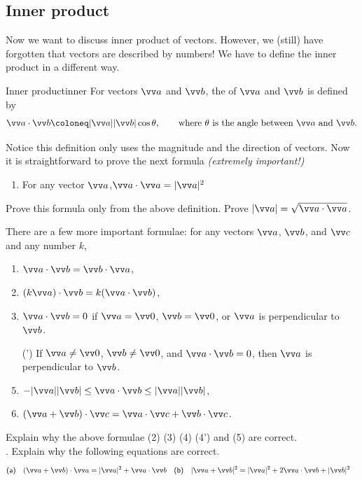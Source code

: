 \documentclass[11pt,pdfa,lastpage]{MishoNote}
\begin{document}
\subsection{Inner product}
Now we want to discuss inner product of vectors. However, we (still) have forgotten that vectors are described by numbers!
We have to define the inner product in a different way.
\begin{definition}{Inner product}{inner}
  For vectors $\vc a$ and $\vc b$, the  of $\vc a$ and $\vc b$ is defined by
  \[ \vc a\cdot\vc b\deq|\vc a||\vc b|\cos\theta, \qquad \text{where $\theta$ is the angle between $\vc a$ and $\vc b$.} \]
\end{definition}
Notice this definition only uses the magnitude and the direction of vectors.
Now it is straightforward to prove the next formula \emph{(extremely important!)}
\begin{enumerate}[label=\textsf{(\arabic*)}]
\item
  For any vector $\vc a$,\qquad $\vc a\cdot\vc a=|\vc a|^2$
\end{enumerate}
\begin{quizzes}
\Quiz[S] Prove this formula only from the above definition. Prove $|\vc a|=\sqrt{\vc a\cdot\vc a}$.
\end{quizzes}
There are a few more important formulae: for any vectors $\vc a$, $\vc b$, and $\vc c$ and any number $k$,
\begin{enumerate}[label=\textsf{(\arabic*)},resume]
    \item $\vc a\cdot\vc b=\vc b\cdot\vc a$,
    \item $(k\vc a)\cdot\vc b=k(\vc a\cdot\vc b)$,
    \item $\vc a\cdot\vc b=0$ if $\vc a=\vc 0$, $\vc b=\vc 0$, or $\vc a$ is perpendicular to $\vc b$.
    \item[\textsf{(\arabic{enumi}')}] If $\vc a\neq \vc 0$, $\vc b\neq\vc 0$, and $\vc a\cdot\vc b=0$, then $\vc a$ is perpendicular to $\vc b$.
    \item $-|\vc a||\vc b|\le \vc a\cdot\vc b\le|\vc a||\vc b|$,
    \item $(\vc a+\vc b)\cdot\vc c=\vc a\cdot\vc c+\vc b\cdot \vc c$.
\end{enumerate}
\begin{quizzes}
  \Quiz[B] Explain why the above formulae (2) (3) (4) (4') and (5) are correct.
  \\\phantom.\hfill{}
  \Quiz[S] Explain why the following equations are correct.
  \begin{align*}
    \text{\textsf{(a)}}\quad &(\vc a+\vc b)\cdot\vc a=|\vc a|^2+\vc a\cdot\vc b &
    \text{\textsf{(b)}}\quad &|\vc a+\vc b|^2=|\vc a|^2+2\vc a\cdot\vc b+|\vc b|^2
  \end{align*}
\end{quizzes}
\end{document}

